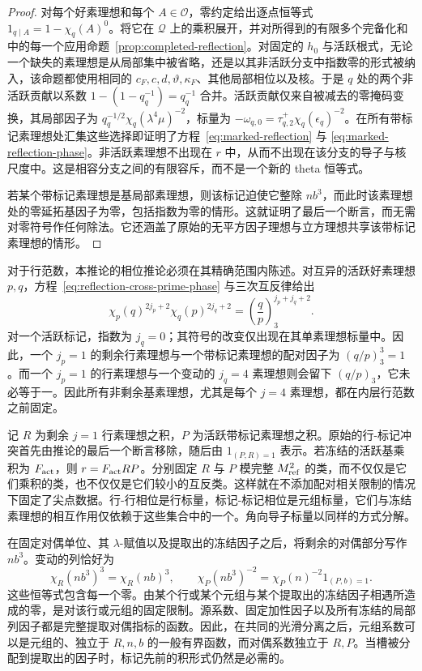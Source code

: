 \documentclass[11pt,a4paper]{article}
\numberwithin{equation}{section}
\numberwithin{figure}{section}
\theoremstyle{definition}
\theoremstyle{remark}
\begin{document}
\begin{proof}
对每个好素理想和每个 \(A\in\mathcal O\)，零约定给出逐点恒等式 \(1_{q\mid A}=1-\chi_q(A)^0\)。将它在 \(\mathcal Q\) 上的乘积展开，并对所得到的有限多个完备化和中的每一个应用命题~\ref{prop:completed-reflection}。对固定的 \(h_0\) 与活跃根式，无论一个缺失的素理想是从局部集中被省略，还是以其非活跃分支中指数零的形式被纳入，该命题都使用相同的 \(c_F,c,d,\vartheta,\kappa_F\)、其他局部相位以及核。于是 \(q\) 处的两个非活跃贡献以系数 \(1-(1-q_q^{-1})=q_q^{-1}\) 合并。活跃贡献仅来自被减去的零掩码变换，其局部因子为 \(q_q^{-1/2}\chi_q(\lambda^4\mu)^{-2}\)，标量为 \(-\omega_{q,0}=\tau_{q,2}^{+}\chi_q(\epsilon_q)^{-2}\)。在所有带标记素理想处汇集这些选择即证明了方程~\eqref{eq:marked-reflection} 与 \eqref{eq:marked-reflection-phase}。非活跃素理想不出现在 \(r\) 中，从而不出现在该分支的导子与核尺度中。这是相容分支之间的有限容斥，而不是一个新的 theta 恒等式。

若某个带标记素理想是基局部素理想，则该标记迫使它整除 \(nb^3\)，而此时该素理想处的零延拓基因子为零，包括指数为零的情形。这就证明了最后一个断言，而无需对零符号作任何除法。它还涵盖了原始的无平方因子理想与立方理想共享该带标记素理想的情形。
\end{proof}

对于行范数，本推论的相位推论必须在其精确范围内陈述。对互异的活跃好素理想 \(p,q\)，方程~\eqref{eq:reflection-cross-prime-phase} 与三次互反律给出
\begin{equation}\label{eq:reflection-pair-phase}
 \chi_p(q)^{2j_p+2}\chi_q(p)^{2j_q+2}
       =\left(\frac qp\right)_3^{j_p+j_q+2}.
\end{equation}
对一个活跃标记，指数为 \(j_q=0\)；其符号的改变仅出现在其单素理想标量中。因此，一个 \(j_p=1\) 的剩余行素理想与一个带标记素理想的配对因子为 \((q/p)_3^3=1\)。而一个 \(j_p=1\) 的行素理想与一个变动的 \(j_q=4\) 素理想则会留下 \((q/p)_3\)，它未必等于一。因此所有非剩余基素理想，尤其是每个 \(j=4\) 素理想，都在内层行范数之前固定。

记 \(R\) 为剩余 \(j=1\) 行素理想之积，\(P\) 为活跃带标记素理想之积。原始的行-标记冲突首先由推论的最后一个断言移除，随后由 \(1_{(P,R)=1}\) 表示。若冻结的活跃基乘积为 \(F_{\rm act}\)，则 \(r=F_{\rm act}RP\)。分别固定 \(R\) 与 \(P\) 模完整 \(M_{\rm ref}^2\) 的类，而不仅仅是它们乘积的类，也不仅仅是它们较小的互反类。这样就在不添加配对相关限制的情况下固定了尖点数据。行-行相位是行标量，标记-标记相位是元组标量，它们与冻结素理想的相互作用仅依赖于这些集合中的一个。角向导子标量以同样的方式分解。

在固定对偶单位、其 \(\lambda\)-赋值以及提取出的冻结因子之后，将剩余的对偶部分写作 \(nb^3\)。变动的列恰好为
\[
 \chi_R(nb^3)^3=\chi_R(nb)^3,\qquad
 \chi_P(nb^3)^{-2}=\chi_P(n)^{-2}1_{(P,b)=1}.
\]
这些恒等式包含每一个零。由某个行或某个元组与某个提取出的冻结因子相遇所造成的零，是对该行或元组的固定限制。源系数、固定加性因子以及所有冻结的局部列因子都是完整提取对偶指标的函数。因此，在共同的光滑分离之后，元组系数可以是元组的、独立于 \(R,n,b\) 的一般有界函数，而对偶系数独立于 \(R,P\)。当槽被分配到提取出的因子时，标记先前的积形式仍然是必需的。
\end{document}
